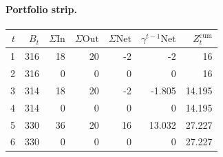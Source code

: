 \documentclass[12pt, a4paper]{article}
\begin{document}
\paragraph{Portfolio strip.}
\begin{center}
\begin{tabular}{rrrrrrr}
\toprule
$t$ & $B_t$ & $\Sigma\mathrm{In}$ & $\Sigma\mathrm{Out}$ & $\Sigma\mathrm{Net}$ & $\gamma^{t-1}\mathrm{Net}$ & $Z_t^{\mathrm{cum}}$\\
\midrule
1 & 316 & 18 & 20 & -2 & -2 & 16 \\
2 & 316 & 0 & 0 & 0 & 0 & 16 \\
3 & 314 & 18 & 20 & -2 & -1.805 & 14.195 \\
4 & 314 & 0 & 0 & 0 & 0 & 14.195 \\
5 & 330 & 36 & 20 & 16 & 13.032 & 27.227 \\
6 & 330 & 0 & 0 & 0 & 0 & 27.227 \\
\bottomrule
\end{tabular}
\end{center}
\end{document}
